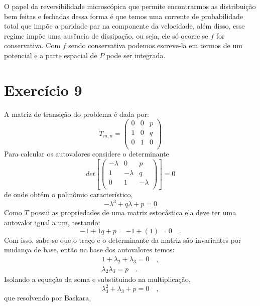 \documentclass[12pt]{article}
\begin{document}
O papel da reversibilidade microscópica que permite encontrarmos as distribuição bem feitas e fechadas dessa forma é que temos uma corrente de probabilidade total que impõe a paridade par na componente da velocidade, além disso, esse regime impõe uma ausência de dissipação, ou seja, ele só ocorre se $f$ for conservativa. Com $f$ sendo conservativa podemos escreve-la em termos de um potencial e a parte espacial de $P$ pode ser integrada. 

\section*{Exercício 9}
A matriz de transição do problema é dada por:
\begin{equation}
T_{m,n} = 
 \begin{pmatrix}
  0 & 0 & p \\
  1 & 0 & q \\
  0 & 1 & 0 \\
 \end{pmatrix}
\end{equation}
Para calcular os autovalores considere o determinante 
\begin{equation}
det\left[
 \begin{pmatrix}
  -\lambda & 0 & p \\
  1 & -\lambda & q \\
  0 & 1 & -\lambda \\
 \end{pmatrix}\right] = 0
\end{equation}
de onde obtém o polinômio característico,
\begin{equation}
-\lambda^3 + q\lambda + p = 0
\end{equation}
Como $T$ possui as propriedades de uma matriz estocástica ela deve ter uma autovalor igual a um, testando:
\begin{equation}
-1 + 1q + p = -1 + (1) = 0 \quad. 
\end{equation}
Com isso, sabe-se que o traço e o determinante da matriz são invariantes por mudança de base, então na base dos autovalores temos:
\begin{align}
1 + \lambda_2 + \lambda_3 = 0 \quad, \\
\lambda_2 \lambda_3 = p  \quad. 
\end{align}
Isolando a equação da soma e substituindo na multiplicação,
\begin{equation}
\lambda_3^2 + \lambda_3 + p = 0 \quad ,
\end{equation}
que resolvendo por Baskara,
\end{document}
